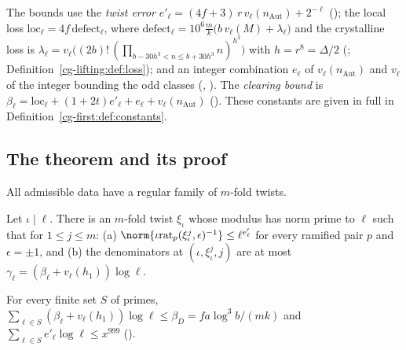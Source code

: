 The bounds use the \emph{twist error}
$e'_\ell=(4f+3)\,r\,v_\ell(n_{\mathrm{Aut}})+2^{-\ell}$ (); the local loss
$\mathrm{loc}_\ell=4f\,\mathrm{defect}_\ell$, where
$\mathrm{defect}_\ell=10^6\tfrac mk\bigl(b\,v_\ell(M)+\lambda_\ell\bigr)$ and the crystalline loss is
$\lambda_\ell=v_\ell\bigl((2b)!\,(\prod_{b-30h^3<n\le b+30h^3}n)^{h^3}\bigr)$ with $h=r^8=\Delta/2$
(;
Definition~\ref{cg-lifting:def:loss}); and an integer
combination $e_\ell$ of $v_\ell(n_{\mathrm{Aut}})$ and $v_\ell$ of the integer bounding the odd classes
(, ). The \emph{clearing bound} is $\beta_\ell=\mathrm{loc}_\ell+(1+2t)e'_\ell+e_\ell+v_\ell(n_{\mathrm{Aut}})$
(). These constants are given in full in
Definition~\ref{cg-first:def:constants}.

\subsection{The theorem and its proof}\label{cg-selmer:sec:main}

\begin{theorem}\label{cg-selmer:thm:regular}
All admissible data have a regular family of $m$-fold twists.
\end{theorem}

\begin{proposition}
\label{cg-selmer:prop:oneprime}
Let $\iota\mid\ell$. There is an $m$-fold twist $\xi_\iota$ whose modulus has norm prime to $\ell$ such
that for $1\le j\le m$: (a) $\norm{\iota\mathrm{rat}_p(\xi_\iota^j,\epsilon)^{-1}}\le\ell^{e'_\ell}$ for every
ramified pair $p$ and $\epsilon=\pm1$, and (b) the denominators at $(\iota,\xi_\iota^j,j)$ are at most
$\gamma_\ell=(\beta_\ell+v_\ell(h_1))\log\ell$.
\end{proposition}

\begin{lemma}\label{cg-selmer:lem:budget}
For every finite set $S$ of primes,
$\sum_{\ell\in S}(\beta_\ell+v_\ell(h_1))\log\ell\le\beta_D=f a\log^3b/(mk)$ and
$\sum_{\ell\in S}e'_\ell\log\ell\le x^{999}$ ().
\end{lemma}

